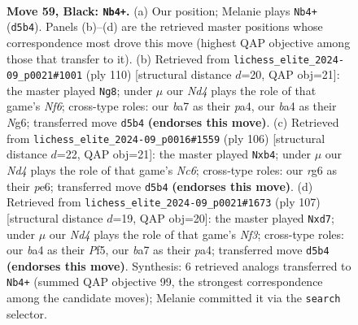 \documentclass[11pt]{article}
\begin{document}
\clearpage

\begin{figure}[p]\centering
\begin{subfigure}{0.46\textwidth}\centering
\resizebox{\linewidth}{!}{%
\newchessgame
\chessboard[
  setfen={2k5/B1p5/6R1/3n1p2/B4P2/8/2K4P/8 b - - 0 59},
  showmover=false,
  pgfstyle=straightmove, color=movearrow, markmove={d5-b4}
]}
\caption{}
\end{subfigure}\hfill
\begin{subfigure}{0.46\textwidth}\centering
\resizebox{\linewidth}{!}{%
\newchessgame
\chessboard[
  setfen={2r5/7P/1p1k1NN1/8/p2Pp3/8/6K1/8 w - - 0 56},
  showmover=false,
  pgfstyle=straightmove, color=movearrow, markmove={f6-g8}
]}
\caption{}
\end{subfigure}
\\[4pt]
\begin{subfigure}{0.46\textwidth}\centering
\resizebox{\linewidth}{!}{%
\newchessgame
\chessboard[
  setfen={4k3/8/2N1p1K1/4P3/1p4P1/8/b7/8 w - - 0 54},
  showmover=false,
  pgfstyle=straightmove, color=movearrow, markmove={c6-b4}
]}
\caption{}
\end{subfigure}\hfill
\begin{subfigure}{0.46\textwidth}\centering
\resizebox{\linewidth}{!}{%
\newchessgame
\chessboard[
  setfen={8/3P4/5n1k/p4p2/P1B3p1/8/5p2/3K4 b - - 0 54},
  showmover=false,
  pgfstyle=straightmove, color=movearrow, markmove={f6-d7}
]}
\caption{}
\end{subfigure}
\caption{\textbf{Move 59, Black: \texttt{Nb4+}.} (a) Our position; Melanie plays \texttt{Nb4+} (\texttt{d5b4}). Panels (b)--(d) are the retrieved master positions whose correspondence most drove this move (highest QAP objective among those that transfer to it). (b) Retrieved from \texttt{lichess\_elite\_2024-09\_p0021\#1001} (ply 110) [structural distance $d$=20, QAP obj=21]: the master played \texttt{Ng8}; under $\mu$ our \emph{Nd4} plays the role of that game's \emph{Nf6}; cross-type roles: our \emph{b}a7 as their \emph{p}a4, our \emph{b}a4 as their \emph{N}g6; transferred move \texttt{d5b4} \textbf{(endorses this move)}. (c) Retrieved from \texttt{lichess\_elite\_2024-09\_p0016\#1559} (ply 106) [structural distance $d$=22, QAP obj=21]: the master played \texttt{Nxb4}; under $\mu$ our \emph{Nd4} plays the role of that game's \emph{Nc6}; cross-type roles: our \emph{r}g6 as their \emph{p}e6; transferred move \texttt{d5b4} \textbf{(endorses this move)}. (d) Retrieved from \texttt{lichess\_elite\_2024-09\_p0021\#1673} (ply 107) [structural distance $d$=19, QAP obj=20]: the master played \texttt{Nxd7}; under $\mu$ our \emph{Nd4} plays the role of that game's \emph{Nf3}; cross-type roles: our \emph{b}a4 as their \emph{P}f5, our \emph{b}a7 as their \emph{p}a4; transferred move \texttt{d5b4} \textbf{(endorses this move)}. Synthesis: 6 retrieved analogs transferred to \texttt{Nb4+} (summed QAP objective 99, the strongest correspondence among the candidate moves); Melanie committed it via the \texttt{search} selector.}
\label{fig:thought-m117}
\end{figure}
\end{document}
